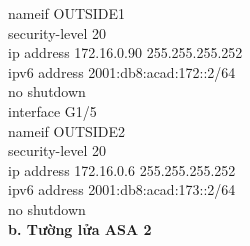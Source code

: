 \documentclass[12pt,a4paper]{report}
\begin{document}
{\hspace*{2cm}nameif OUTSIDE1\\
\hspace*{2cm}security-level 20\\
\hspace*{2cm}ip address 172.16.0.90 255.255.255.252\\
\hspace*{2cm}ipv6 address 2001:db8:acad:172::2/64\\
\hspace*{2cm}no shutdown\\
\hspace*{2cm}interface G1/5\\
\hspace*{2cm}nameif OUTSIDE2\\
\hspace*{2cm}security-level 20\\
\hspace*{2cm}ip address 172.16.0.6 255.255.255.252\\
\hspace*{2cm}ipv6 address 2001:db8:acad:173::2/64\\
\hspace*{2cm}no shutdown\\}
\hspace*{1cm}\textbf{b. Tường lửa ASA 2}\\
\end{document}

